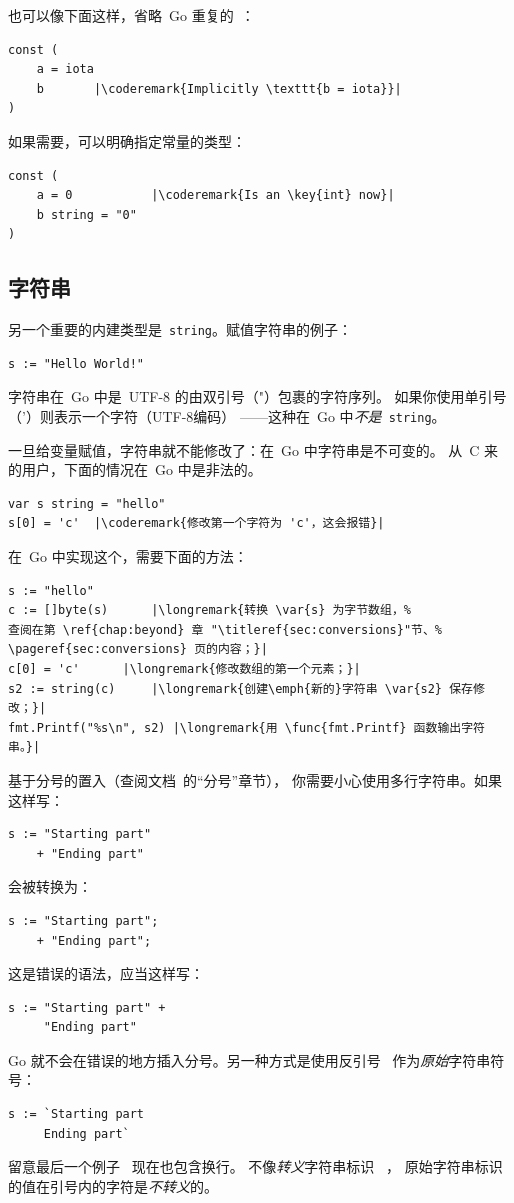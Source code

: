 也可以像下面这样，省略~Go 重复的~：
\begin{lstlisting}
const (
	a = iota
	b	    |\coderemark{Implicitly \texttt{b = iota}}|
)
\end{lstlisting}
如果需要，可以明确指定常量的类型：
\begin{lstlisting}
const (
	a = 0           |\coderemark{Is an \key{int} now}|
	b string = "0" 
)
\end{lstlisting}

\subsection{字符串}
另一个重要的内建类型是~\lstinline{string}。赋值字符串的例子：
\begin{lstlisting}
s := "Hello World!"
\end{lstlisting}
字符串在~Go 中是~UTF-8 的由双引号（"）包裹的字符序列。
如果你使用单引号（'）则表示一个字符（UTF-8编码）
——这种在~Go 中\emph{不是}~\lstinline{string}。

一旦给变量赋值，字符串就不能修改了：在~Go 中字符串是不可变的。
从~C 来的用户，下面的情况在~Go 中是非法的。
\begin{lstlisting}
var s string = "hello"
s[0] = 'c'  |\coderemark{修改第一个字符为 'c'，这会报错}|
\end{lstlisting}
在~Go 中实现这个，需要下面的方法：
\begin{lstlisting}
s := "hello"
c := []byte(s)	    |\longremark{转换 \var{s} 为字节数组，%
查阅在第 \ref{chap:beyond} 章 "\titleref{sec:conversions}"节、%
\pageref{sec:conversions} 页的内容；}|
c[0] = 'c'	    |\longremark{修改数组的第一个元素；}|
s2 := string(c)     |\longremark{创建\emph{新的}字符串 \var{s2} 保存修改；}|
fmt.Printf("%s\n", s2) |\longremark{用 \func{fmt.Printf} 函数输出字符串。}|
\end{lstlisting}
\showremarks

\begin{lbar}[多行字符串]
基于分号的置入（查阅文档~\cite{effective_go}的``分号''章节），
你需要小心使用多行字符串。如果这样写：
\begin{lstlisting}
s := "Starting part"
    + "Ending part"
\end{lstlisting}
会被转换为：
\begin{lstlisting}
s := "Starting part";
    + "Ending part";
\end{lstlisting}
这是错误的语法，应当这样写：
\begin{lstlisting}
s := "Starting part" +
     "Ending part"
\end{lstlisting}
Go 就不会在错误的地方插入分号。另一种方式是使用反引号~ 作为\emph{原始}字符串符号：
\begin{lstlisting}
s := `Starting part
     Ending part`
\end{lstlisting}
留意最后一个例子~ 现在也包含换行。
不像\emph{转义}字符串标识~ ，
原始字符串标识的值在引号内的字符是\emph{不转义}的。
\end{lbar}

